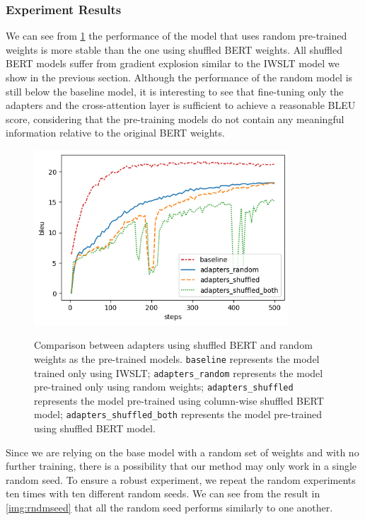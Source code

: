 \subsubsection{Experiment Results}
We can see from \cref{img:shfrndcmp} the performance of the model that uses random pre-trained weights is more stable than the one using shuffled BERT weights. All shuffled BERT models suffer from gradient explosion similar to the IWSLT model we show in the previous section. Although the performance of the random model is still below the baseline model, it is interesting to see that fine-tuning only the adapters and the cross-attention layer is sufficient to achieve a reasonable BLEU score, considering that the pre-training models do not contain any meaningful information relative to the original BERT weights.
\begin{figure}[h]
    {\includegraphics[width=0.85\textwidth]{img/randomshuffled.png}}
    \centering
    \caption[Comparison between adapters using shuffled BERT and random weights as the pre-trained models.]{Comparison between adapters using shuffled BERT and random weights as the pre-trained models. \texttt{baseline} represents the model trained only using IWSLT; \texttt{adapters\_random} represents the model pre-trained only using random weights; \texttt{adapters\_shuffled} represents the model pre-trained using column-wise shuffled BERT model; \texttt{adapters\_shuffled\_both} represents the model pre-trained using shuffled BERT model.}
    \label{img:shfrndcmp}
\end{figure}

Since we are relying on the base model with a random set of weights and with no further training, there is a possibility that our method may only work in a single random seed. To ensure a robust experiment, we repeat the random experiments ten times with ten different random seeds. We can see from the result in \cref{img:rndmseed} that all the random seed performs similarly to one another.

